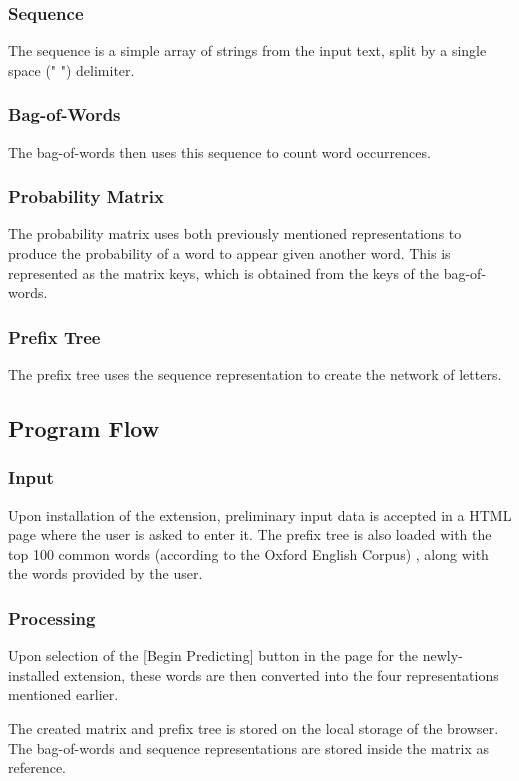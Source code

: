 \documentclass[journal]{./IEEE/IEEEtran}
\begin{document}
\subsubsection{Sequence}
The sequence is a simple array of strings from the input text, split by a single space (" ") delimiter.

\subsubsection{Bag-of-Words}
The bag-of-words then uses this sequence to count word occurrences.

\subsubsection{Probability Matrix}
The probability matrix uses both previously mentioned representations to produce the probability of a word to appear given another word. This is represented as the matrix keys, which is obtained from the keys of the bag-of-words.

\subsubsection{Prefix Tree}
The prefix tree uses the sequence representation to create the network of letters.

\subsection{Program Flow}
\subsubsection{Input}
Upon installation of the extension, preliminary input data is accepted in a HTML page where the user is asked to enter it. The prefix tree is also loaded with the top 100 common words (according to the Oxford English Corpus) \cite{OxfordFacts}, along with the words provided by the user.

\subsubsection{Processing}
Upon selection of the [Begin Predicting] button in the page for the newly-installed extension, these words are then converted into the four representations mentioned earlier.

The created matrix and prefix tree is stored on the local storage of the browser. The bag-of-words and sequence representations are stored inside the matrix as reference.
\end{document}
